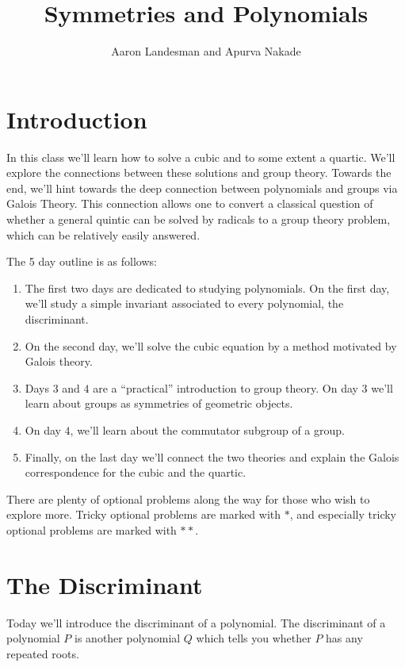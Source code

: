 \documentclass[reqno, 12pt, letter]{article}
\title{Symmetries and Polynomials}
\author{Aaron Landesman and Apurva Nakade}
\theoremstyle{plain}
\theoremstyle{definition}
\theoremstyle{remark}
\numberwithin{equation}{section}
\begin{document}
\maketitle


\section*{Introduction}
In this class we'll learn how to solve a cubic and to some extent a quartic. We'll explore the connections between these solutions and group theory.
Towards the end, we'll hint towards the deep connection between polynomials and groups via Galois Theory. This connection allows one to convert a classical question of whether a general quintic can be solved by radicals to a group theory problem, which can be relatively easily answered. 

The 5 day outline is as follows: 
\begin{enumerate}
	\item The first two days are dedicated to studying polynomials. On the first day, we'll study a simple invariant associated to every polynomial, the discriminant.
	\item On the second day, we'll solve the cubic equation by a method motivated by Galois theory.
	\item Days $3$ and $4$ are a ``practical'' introduction to group theory. On day $3$ we'll learn about groups as symmetries of geometric objects.
	\item On day $4$, we'll learn about the commutator subgroup of a group.
	\item Finally, on the last day we'll connect the two theories and explain the Galois correspondence for the cubic and the quartic. 
\end{enumerate}
There are plenty of optional problems along the way for those who wish to explore more.
Tricky optional problems are marked with $*$, and especially tricky optional problems are marked with $**$.

\newpage
\section{The Discriminant}
Today we'll introduce the discriminant of a polynomial. The discriminant of a polynomial $P$ is another polynomial $Q$ which tells you
whether $P$ has any repeated roots.
\end{document}

